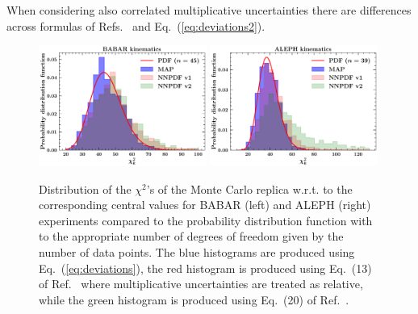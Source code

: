 \documentclass[10pt,a4paper]{article}
\begin{document}
When considering also correlated multiplicative uncertainties there
are differences across formulas of Refs.~\cite{Ball:2008by,
  Ball:2014uwa} and Eq.~(\ref{eq:deviations2}).


\begin{figure}[h]
  \begin{centering}
    \includegraphics[width=0.49\textwidth]{plots/Chi2DistBABAR}
    \includegraphics[width=0.49\textwidth]{plots/Chi2DistALEPH}
    \caption{Distribution of the $\chi^2$'s of the Monte Carlo replica
      w.r.t. to the corresponding central values for BABAR (left) and
      ALEPH (right) experiments compared to the probability
      distribution function with to the appropriate number of degrees
      of freedom given by the number of data points. The blue
      histograms are produced using Eq.~(\ref{eq:deviations}), the red
      histogram is produced using Eq.~(13) of Ref.~\cite{Ball:2008by}
      where multiplicative uncertainties are treated as relative,
      while the green histogram is produced using Eq.~(20) of
      Ref.~\cite{Ball:2014uwa}. \label{fig:Chi2Dist}}
  \end{centering}
\end{figure}
\end{document}
